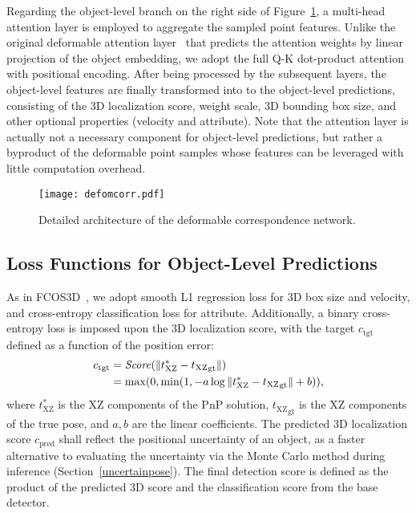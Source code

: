 \documentclass[10pt,twocolumn,letterpaper]{article}
\begin{document}
Regarding the object-level branch on the right side of Figure~\ref{fig:deformcorr}, a multi-head attention layer is employed to aggregate the sampled point features. Unlike the original deformable attention layer~\cite{deformabledetr} that predicts the attention weights by linear projection of the object embedding, we adopt the full Q-K dot-product attention with positional encoding. After being processed by the subsequent layers, the object-level features are finally transformed into to the object-level predictions, consisting of the 3D localization score, weight scale, 3D bounding box size, and other optional properties (velocity and attribute). Note that the attention layer is actually not a necessary component for object-level predictions, but rather a byproduct of the deformable point samples whose features can be leveraged with little computation overhead.

\begin{figure}[t]
\begin{center}
    \texttt{[image: defomcorr.pdf]}
\end{center}
\vspace{-1ex}
\caption{Detailed architecture of the deformable correspondence network.}
\label{fig:deformcorr}
\end{figure}

\subsection{Loss Functions for Object-Level Predictions}
As in FCOS3D~\cite{fcos3d}, we adopt smooth L1 regression loss for 3D box size and velocity, and cross-entropy classification loss for attribute. Additionally, a binary cross-entropy loss is imposed upon the 3D localization score, with the target $c_\text{tgt}$ defined as a function of the position error:
\begin{align}
    c_\text{tgt} &= \mathit{Score}(\|t^\ast_\text{XZ} - {t_\text{XZ}}_\text{gt}\|) \notag\\
    &= \max(0, \min(1, -a \log{\|t^\ast_\text{XZ} - {t_\text{XZ}}_\text{gt}\|} + b)),
    \label{eqn:score}
\end{align}
where $t^\ast_\text{XZ}$ is the XZ components of the PnP solution, ${t_\text{XZ}}_\text{gt}$ is the XZ components of the true pose, and $a, b$ are the linear coefficients. The predicted 3D localization score $c_\text{pred}$ shall reflect the positional uncertainty of an object, as a faster alternative to evaluating the uncertainty via the Monte Carlo method during inference (Section~\ref{uncertainpose}). The final detection score is defined as the product of the predicted 3D score and the classification score from the base detector. 
\end{document}
